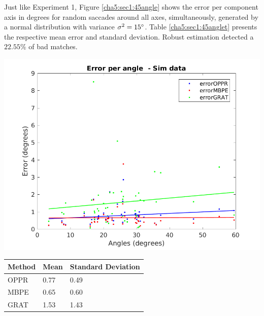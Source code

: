 Just like Experiment 1, Figure \ref{cha5:sec1:45angle} shows the error per  component axis in degrees for random saccades around all axes, simultaneously, generated by a normal distribution with variance $\sigma^2 = 15 \degree $. Table \ref{cha5:sec1:45anglet} presents the respective mean error and standard deviation. Robust estimation detected a $ 22.55 \%$ of bad matches.

\begin{minipage}{0.5\textwidth}
	\centering
	\includegraphics[width=\textwidth]{images/sim/45angle.png}
	\label{cha5:sec1:45angle}
\end{minipage}
\begin{minipage}{0.5\textwidth}
	\centering
	\begin{tabular}{| l | l | l |}
		\hline
		Method & Mean & Standard Deviation \\
		\hline
		OPPR &  0.77 \degree & 0.49 \degree \\
		\hline
		MBPE &  0.65 \degree & 0.60 \degree \\
		\hline
		GRAT &  1.53 \degree & 1.43 \degree \\ 
		\hline
	\end{tabular}
	\label{cha5:sec1:45anglet}
\end{minipage}\\

